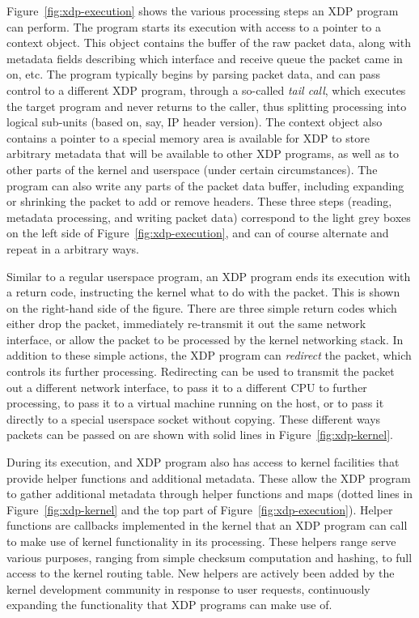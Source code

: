 \documentclass[10pt,sigconf]{acmart}
\begin{document}
Figure~\ref{fig:xdp-execution} shows the various processing steps an XDP program
can perform. The program starts its execution with access to a pointer to a
context object. This object contains the buffer of the raw packet data, along
with metadata fields describing which interface and receive queue the packet
came in on, etc. The program typically begins by parsing packet data, and can
pass control to a different XDP program, through a so-called \emph{tail call},
which executes the target program and never returns to the caller, thus
splitting processing into logical sub-units (based on, say, IP header version).
The context object also contains a pointer to a special memory area is available
for XDP to store arbitrary metadata that will be available to other XDP
programs, as well as to other parts of the kernel and userspace (under certain
circumstances). The program can also write any parts of the packet data buffer,
including expanding or shrinking the packet to add or remove headers. These
three steps (reading, metadata processing, and writing packet data) correspond
to the light grey boxes on the left side of Figure~\ref{fig:xdp-execution}, and
can of course alternate and repeat in a arbitrary ways.

Similar to a regular userspace program, an XDP program ends its execution with a
return code, instructing the kernel what to do with the packet. This is shown on
the right-hand side of the figure. There are three simple return codes which
either drop the packet, immediately re-transmit it out the same network
interface, or allow the packet to be processed by the kernel networking stack.
In addition to these simple actions, the XDP program can \emph{redirect} the
packet, which controls its further processing. Redirecting can be used to
transmit the packet out a different network interface, to pass it to a different
CPU to further processing, to pass it to a virtual machine running on the host,
or to pass it directly to a special userspace socket without copying. These
different ways packets can be passed on are shown with solid lines in
Figure~\ref{fig:xdp-kernel}.

During its execution, and XDP program also has access to kernel facilities that
provide helper functions and additional metadata. These allow the XDP program to
gather additional metadata through helper functions and maps (dotted lines in
Figure~\ref{fig:xdp-kernel} and the top part of Figure~\ref{fig:xdp-execution}).
Helper functions are callbacks implemented in the kernel that an XDP program can
call to make use of kernel functionality in its processing. These helpers range
serve various purposes, ranging from simple checksum computation and hashing, to
full access to the kernel routing table. New helpers are actively been added by
the kernel development community in response to user requests, continuously
expanding the functionality that XDP programs can make use of.
\end{document}
